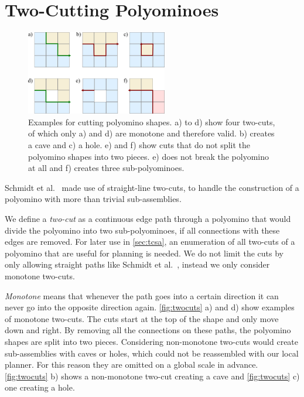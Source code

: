 \section{Two-Cutting Polyominoes}
\label{sec:twocutting}

\begin{figure}
	\centering
	\includegraphics[width=0.55\textwidth]{figures/twocuts.pdf}
	\caption[Different cuts for polyomino shapes]{Examples for cutting polyomino shapes. a) to d) show four two-cuts, of which only a) and d) are monotone and therefore valid. b) creates a cave and c) a hole. e) and f) show cuts that do not split the polyomino shapes into two pieces. e) does not break the polyomino at all and f) creates three sub-polyominoes.}
	\label{fig:twocuts}
\end{figure}

Schmidt et al.\ \cite{Schmidt2018} made use of straight-line two-cuts, to handle the construction of a polyomino with more than trivial sub-assemblies.

We define a \textit{two-cut} as a continuous edge path through a polyomino that would divide the polyomino into two sub-polyominoes, if all connections with these edges are removed.
For later use in \autoref{sec:tcsa}, an enumeration of all two-cuts of a polyomino that are useful for planning is needed.
We do not limit the cuts by only allowing straight paths like Schmidt et al.\ \cite{Schmidt2018}, instead we only consider monotone two-cuts.

\textit{Monotone} means that whenever the path goes into a certain direction it can never go into the opposite direction again.
\autoref{fig:twocuts} a) and d) show examples of monotone two-cuts.
The cuts start at the top of the shape and only move down and right.
By removing all the connections on these paths, the polyomino shapes are split into two pieces.
Considering non-monotone two-cuts would create sub-assemblies with caves or holes, which could not be reassembled with our local planner.
For this reason they are omitted on a global scale in advance.
\autoref{fig:twocuts} b) shows a non-monotone two-cut creating a cave and \autoref{fig:twocuts} c) one creating a hole.

